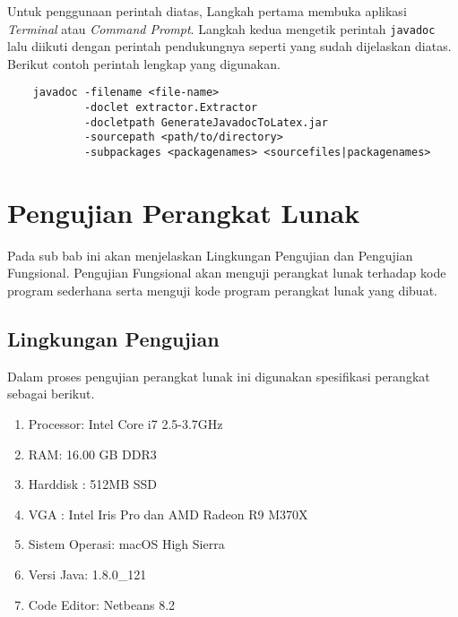 Untuk penggunaan perintah diatas, Langkah pertama membuka aplikasi {\it Terminal} atau {\it Command Prompt}. Langkah kedua mengetik perintah {\tt javadoc} lalu diikuti dengan perintah pendukungnya seperti yang sudah dijelaskan diatas. Berikut contoh perintah lengkap yang digunakan.

\begin{verbatim}
	javadoc -filename <file-name>
	        -doclet extractor.Extractor
	        -docletpath GenerateJavadocToLatex.jar
	        -sourcepath <path/to/directory>
	        -subpackages <packagenames> <sourcefiles|packagenames>
\end{verbatim}

\section{Pengujian Perangkat Lunak}
\label{sec: pengujian perangkat lunak}
Pada sub bab ini akan menjelaskan Lingkungan Pengujian dan Pengujian Fungsional. Pengujian Fungsional akan menguji perangkat lunak terhadap kode program sederhana serta menguji kode program perangkat lunak yang dibuat.
\subsection{Lingkungan Pengujian}
\label{sec:lingkungan perangkat lunak}
Dalam proses pengujian perangkat lunak ini digunakan spesifikasi perangkat sebagai berikut.

\begin{enumerate}
	\item Processor: Intel Core i7 2.5-3.7GHz 
	\item RAM: 16.00 GB DDR3	
	\item Harddisk : 512MB SSD
	\item VGA : Intel Iris Pro dan AMD Radeon R9 M370X
	\item Sistem Operasi: macOS High Sierra
	\item Versi Java: 1.8.0\_121
	\item Code Editor: Netbeans 8.2
\end{enumerate}

